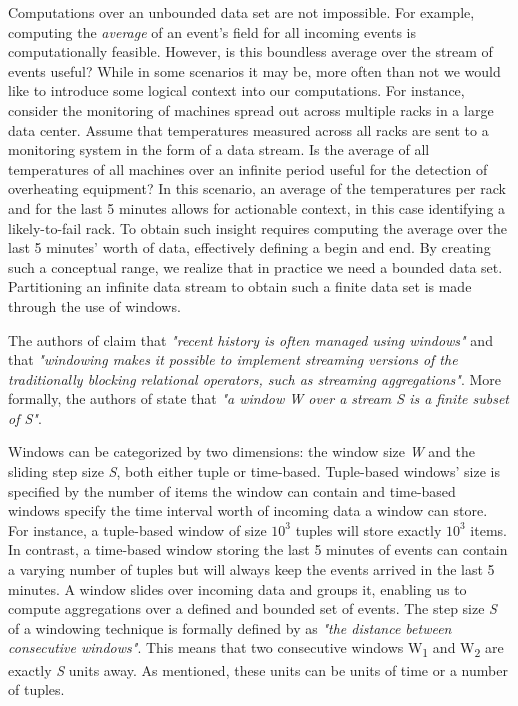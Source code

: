 Computations over an unbounded data set are not impossible. For example, computing the \textit{average} of an event's field for all incoming events is computationally feasible. However, is this boundless average over the stream of events useful? While in some scenarios it may be, more often than not we would like to introduce some logical context into our computations. For instance, consider the monitoring of machines spread out across multiple racks in a large data center. Assume that temperatures measured across all racks are sent to a monitoring system in the form of a data stream. Is the average of all temperatures of all machines over an infinite period useful for the detection of overheating equipment? In this scenario, an average of the temperatures per rack and for the last 5 minutes allows for actionable context, in this case identifying a likely-to-fail rack. To obtain such insight requires computing the average over the last 5 minutes' worth of data, effectively defining a begin and end. By creating such a conceptual range, we realize that in practice we need a bounded data set. Partitioning an infinite data stream to obtain such a finite data set is made through the use of windows.

The authors of \cite{Wang-Windows-Stream-Processing} claim that \textit{"recent history is often managed using windows"} and that \textit{"windowing makes it possible to implement streaming versions of the traditionally blocking relational operators, such as streaming aggregations"}. More formally, the authors of \cite{Botan-SECRET} state that \textit{"a window W over a stream S is a finite subset of S"}.

Windows can be categorized by two dimensions: the window size \textit{W} and the sliding step size \textit{S}, both either tuple or time-based. Tuple-based windows' size is specified by the number of items the window can contain and time-based windows specify the time interval worth of incoming data a window can store. For instance, a tuple-based window of size $10^3$ tuples will store exactly $10^3$ items. In contrast, a time-based window storing the last 5 minutes of events can contain a varying number of tuples but will always keep the events arrived in the last 5 minutes. A window slides over incoming data and groups it, enabling us to compute aggregations over a defined and bounded set of events. The step size \textit{S} of a windowing technique is formally defined by \cite{Botan-SECRET} as \textit{"the distance between consecutive windows"}. This means that two consecutive windows W\textsubscript{1} and W\textsubscript{2} are exactly \textit{S} units away. As mentioned, these units can be units of time or a number of tuples.

